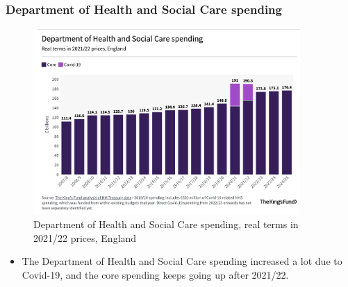         \subsubsection{Department of Health and Social Care spending} 
            \begin{figure}[H]
                \centering
                \includegraphics[width=4in]{images/ch3/7.png}
                \caption{Department of Health and Social Care spending, real terms in 2021/22 prices, England}
            \end{figure} 
                \begin{itemize}
                \item The Department of Health and Social Care spending increased a lot due to Covid-19, and the core spending keeps going up after 2021/22.
            \end{itemize}
